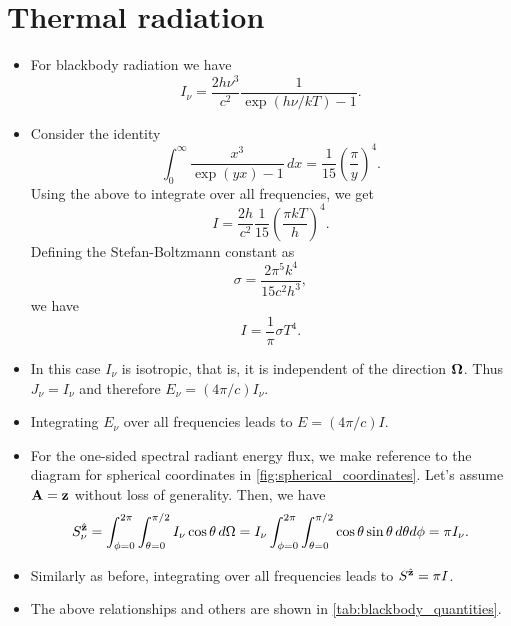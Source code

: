 \documentclass[a4paper,11pt]{article}
\begin{document}
\section{Thermal radiation}

\begin{itemize}
    \item For blackbody radiation we have
    \begin{equation}
        I_\nu = \frac{2h\nu^3}{c^2} \frac{1}{\exp(h\nu/kT) - 1}.
    \end{equation}

    \item Consider the identity 
    \begin{equation}
        \int_0^\infty \frac{x^3}{\exp(yx) - 1} \, dx = \frac{1}{15} \left ( \frac{\pi}{y} \right )^4.
    \end{equation}
    Using the above to integrate over all frequencies, we get
    \begin{equation}
        I = \frac{2h}{c^2} \frac{1}{15} \left ( \frac{ \pi kT}{h} \right )^4.
    \end{equation}
    Defining the Stefan-Boltzmann constant as
    \begin{equation}
        \sigma = \frac{2 \pi^5 k^4}{15 c^2 h^3},
    \end{equation}
    we have
    \begin{equation}
        I = \frac{1}{\pi} \sigma T^4.
    \end{equation}

    \item In this case $I_\nu$ is isotropic, that is, it is independent of the direction $\bm \Omega$. Thus $J_\nu = I_\nu$ and therefore $E_\nu = (4\pi/c) I_\nu$.
    
    \item Integrating $E_\nu$ over all frequencies leads to $E = (4\pi/c) I$.
    
    \item For the one-sided spectral radiant energy flux, we make reference to the diagram for spherical coordinates in \cref{fig:spherical_coordinates}. Let's assume $\mathbf{A} = \mathbf{z}$ without loss of generality. Then, we have
    \begin{equation}
        S_\nu^{\hat{\mathbf{z}}} = \int_{\phi = 0}^{2\pi} \int_{\theta=0}^{\pi/2} I_\nu \cos \theta \, d\Omega = I_\nu \int_{\phi = 0}^{2\pi} \int_{\theta=0}^{\pi/2} \cos \theta \sin \theta \, d\theta d\phi = \pi I_\nu.
    \end{equation}

    \item Similarly as before, integrating over all frequencies leads to $S^{\hat{\mathbf{z}}} = \pi I$.
    
    \item The above relationships and others are shown in \cref{tab:blackbody_quantities}. 
\end{itemize}
\end{document}
